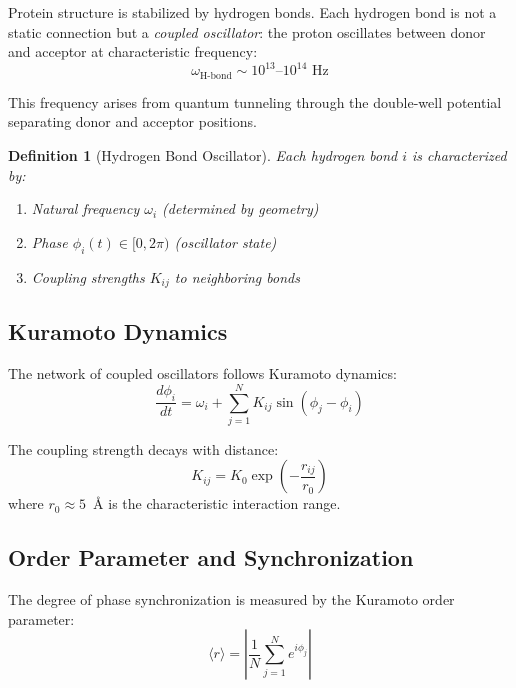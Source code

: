 \documentclass[twocolumn,aps,prx,superscriptaddress,longbibliography]{revtex4-2}
\newtheorem{definition}[theorem]{Definition}
\theoremstyle{remark}
\newcommand{\orderpar}{\langle r \rangle}
\begin{document}
Protein structure is stabilized by hydrogen bonds. Each hydrogen bond is
not a static connection but a \textit{coupled oscillator}: the proton
oscillates between donor and acceptor at characteristic frequency:
\begin{equation}
\omega_\text{H-bond} \sim 10^{13}\text{--}10^{14} \text{ Hz}
\label{eq:hbond_freq}
\end{equation}

This frequency arises from quantum tunneling through the double-well
potential separating donor and acceptor positions.

\begin{definition}[Hydrogen Bond Oscillator]
\label{def:oscillator}
Each hydrogen bond $i$ is characterized by:
\begin{enumerate}
    \item Natural frequency $\omega_i$ (determined by geometry)
    \item Phase $\phi_i(t) \in [0, 2\pi)$ (oscillator state)
    \item Coupling strengths $K_{ij}$ to neighboring bonds
\end{enumerate}
\end{definition}

\subsection{Kuramoto Dynamics}

The network of coupled oscillators follows Kuramoto dynamics:
\begin{equation}
\frac{d\phi_i}{dt} = \omega_i + \sum_{j=1}^{N} K_{ij} \sin(\phi_j - \phi_i)
\label{eq:kuramoto}
\end{equation}

The coupling strength decays with distance:
\begin{equation}
K_{ij} = K_0 \exp\left(-\frac{r_{ij}}{r_0}\right)
\label{eq:coupling}
\end{equation}
where $r_0 \approx 5$~\AA{} is the characteristic interaction range.

\subsection{Order Parameter and Synchronization}

The degree of phase synchronization is measured by the Kuramoto order
parameter:
\begin{equation}
\orderpar = \left| \frac{1}{N} \sum_{j=1}^{N} e^{i\phi_j} \right|
\label{eq:order}
\end{equation}
\end{document}
